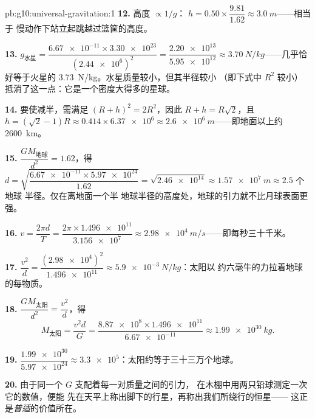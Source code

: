 \begin{solution}{pb:g10:universal-gravitation:1}
\textbf{12.} 高度 $\propto 1/g$：
$h = 0.50 \times \dfrac{9.81}{1.62} \approx \qty{3.0}{m}$——相当于
慢动作下站立起跳越过篮筐的高度。

\textbf{13.} $g_{\text{水星}} = \dfrac{\num{6.67e-11} \times
\num{3.30e23}}{(\num{2.44e6})^2} = \dfrac{\num{2.20e13}}
{\num{5.95e12}} \approx \qty{3.70}{N/kg}$——几乎恰好等于火星的
\qty{3.73}{N/kg}。水星质量较小，但其半径较小
（即下式中 $R^2$ 较小）抵消了这一点：它是一个密度大得多的星球。

\textbf{14.} 要使减半，需满足
$(R + h)^2 = 2 R^2$，因此 $R + h = R\sqrt{2}$，且
$h = (\sqrt{2} - 1) R \approx 0.414 \times \num{6.37e6}
\approx \qty{2.6e6}{m}$——即地面以上约 \qty{2600}{km}。

\textbf{15.} $\dfrac{G M_{\text{地球}}}{d^2} = 1.62$，得
$d = \sqrt{\dfrac{\num{6.67e-11} \times \num{5.97e24}}{1.62}}
= \sqrt{\num{2.46e14}} \approx \qty{1.57e7}{m} \approx 2.5$ 个地球
半径。仅在离地面一个半
地球半径的高度处，地球的引力就不比月球表面更强。

\textbf{16.} $v = \dfrac{2\pi d}{T}
= \dfrac{2\pi \times \num{1.496e11}}{\num{3.156e7}}
\approx \qty{2.98e4}{m/s}$——即每秒三十千米。

\textbf{17.} $\dfrac{v^2}{d} = \dfrac{(\num{2.98e4})^2}{\num{1.496e11}}
\approx \qty{5.9e-3}{N/kg}$：太阳以
约六毫牛的力拉着地球的每物质。

\textbf{18.} $\dfrac{G M_{\text{太阳}}}{d^2} = \dfrac{v^2}{d}$，得
\[
M_{\text{太阳}} = \frac{v^2 d}{G}
= \frac{\num{8.87e8} \times \num{1.496e11}}{\num{6.67e-11}}
\approx \qty{1.99e30}{kg}.
\]

\textbf{19.} $\dfrac{\num{1.99e30}}{\num{5.97e24}} \approx
\num{3.3e5}$：太阳约等于三十三万个地球。

\textbf{20.} 由于同一个 $G$ 支配着每一对质量之间的引力，
在木棚中用两只铅球测定一次它的数值，便能
先在天平上称出脚下的行星，再称出我们所绕行的恒星——
这正是\emph{普适}的价值所在。
\end{solution}
